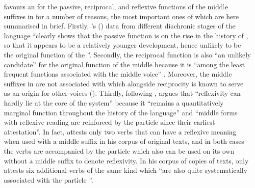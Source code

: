 \citet{inglese:2020} favours an  for the passive, reciprocal, and reflexive functions of the middle suffixes in  for a number of reasons, the most important ones of which are here summarised in brief. Firstly, \citeauthor{inglese:2020}’s (\citeyear[231]{inglese:2020}) data from different diachronic stages of the  language “clearly shows that the passive function is on the rise in the history of , so that it appears to be a relatively younger development, hence unlikely to be the original function of the ”. Secondly, the reciprocal function is also “an unlikely candidate” for the original function of the middle because it is “among the least frequent functions associated with the middle voice” \citep[230]{inglese:2020}. Moreover, the middle suffixes in  are not associated with  which alongside reciprocity is known to serve as an origin for other voices (). Thirdly, following \citet{luraghi:2010, luraghi:2012}, \citet[230]{inglese:2020} argues that “reflexivity can hardly lie at the core of the   system” because it “remains a quantitatively marginal function throughout the history of the language” and “middle forms with reflexive reading are reinforced by the particle  since their earliest attestation”. In fact, \citet[83, 147]{inglese:2020} attests only two verbs that can have a reflexive meaning when used with a middle suffix in his corpus of original  texts, and in both cases the verbs are accompanied by the particle  which also can be used on its own without a middle suffix to denote reflexivity. In his corpus of copies of  texts, \citet[148]{inglese:2020} only attests six additional verbs of the same kind which “are also quite systematically associated with the particle ”. 

